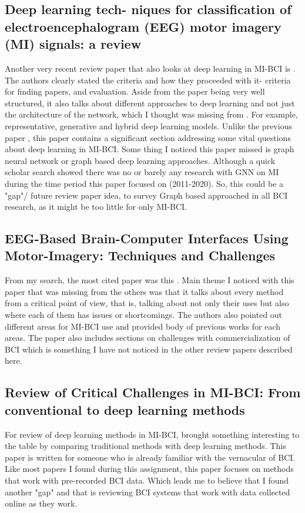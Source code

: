 \subsection*{Deep learning tech-
niques for classification of electroencephalogram (EEG) motor imagery
(MI) signals: a review}\cite{altaheri_deep_2023}
Another very recent review paper that also looks at deep learning in MI-BCI is \cite{altaheri_deep_2023}. The authors clearly stated the criteria and how they proceeded with it- criteria for finding papers, and evaluation.
Aside from the paper being very well structured, it also talks about different approaches to deep learning and not just the architecture of the network, which I thought was missing from \cite{al-saegh_deep_2021}. For example, representative, generative and hybrid deep learning models. Unlike the previous paper \cite{al-saegh_deep_2021}, this paper contains a significant section addressing some vital questions about deep learning in MI-BCI. Some thing I noticed this paper missed is graph neural network or graph based deep learning approaches. Although a quick scholar search showed there was no or barely any research with GNN on MI during the time period this paper focused on (2011-2020). So, this could be a "gap"/ future review paper idea, to survey Graph based approached in all BCI research, as it might be too little for only MI-BCI. 

\subsection*{EEG-Based
Brain-Computer Interfaces Using Motor-Imagery: Techniques and Challenges}\cite{padfield_eeg-based_2019}
From my search, the most cited paper was this \cite{padfield_eeg-based_2019}. Main theme I noticed with this paper that was missing from the others was that it talks about every method from a critical point of view, that is, talking about not only their uses but also where each of them has issues or shortcomings. The authors also pointed out different areas for MI-BCI use and provided body of previous works for each areas. The paper also includes sections on challenges with commercialization of BCI which is something I have not noticed in the other review papers described here. 

\subsection*{Review of Critical Challenges in MI-BCI: From conventional to deep learning methods}\cite{khademi_review_2023}
For review of deep learning methods in MI-BCI, \cite{khademi_review_2023} brought something interesting to the table by comparing traditional methods with deep learning methods. This paper is written for someone who is already familiar with the vernacular of BCI. Like most papers I found during this assignment, this paper focuses on methods that work with pre-recorded BCI data. Which leads me to believe that I found another "gap" and that is reviewing BCI systems that work with data collected online as they work.


